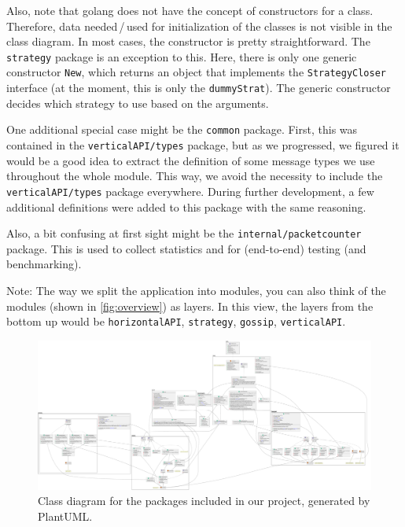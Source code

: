 \documentclass[a4paper,english,10pt,NET]{tumarticle}
\begin{document}
Also, note that golang does not have the concept of constructors for a class.
Therefore, data needed\,/\,used for initialization of the classes is not visible in the class diagram.
In most cases, the constructor is pretty straightforward.
The \texttt{strategy} package is an exception to this.
Here, there is only one generic constructor \texttt{New}, which returns an object that implements the \texttt{StrategyCloser} interface (at the moment, this is only the \texttt{dummyStrat}).
The generic constructor decides which strategy to use based on the arguments.

One additional special case might be the \texttt{common} package.
First, this was contained in the \texttt{verticalAPI/types} package, but as we progressed, we figured it would be a good idea to extract the definition of some message types we use throughout the whole module.
This way, we avoid the necessity to include the \texttt{verticalAPI/types} package everywhere.
During further development, a few additional definitions were added to this package with the same reasoning.

Also, a bit confusing at first sight might be the \texttt{internal/packetcounter} package.
This is used to collect statistics and for (end-to-end) testing (and benchmarking).

Note: The way we split the application into modules, you can also think of the modules (shown in \cref{fig:overview}) as layers.
In this view, the layers from the bottom up would be \texttt{horizontalAPI}, \texttt{strategy}, \texttt{gossip}, \texttt{verticalAPI}.

\begin{landscape}
	\pagestyle{empty}
	\begin{figure}
		\centering
		\hspace*{-0.1\linewidth}\includegraphics[width=1.2\linewidth]{figures/class}
		\caption{Class diagram for the packages included in our project, generated by PlantUML.}
		\label{fig:classDia}
	\end{figure}
\end{landscape}
\end{document}
